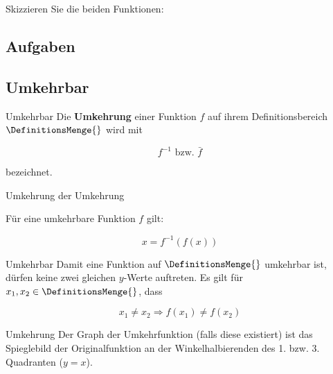 Skizzieren Sie die beiden Funktionen:

\newpage


\subsection{Aufgaben}



\newpage


\subsection{Umkehrbar}
\begin{definition}{Umkehrbar}{}
Die \textbf{Umkehrung} einer Funktion $f$ auf ihrem Definitionsbereich
$\DefinitionsMenge{}$ wird mit

  $$f^{-1} \text{ bzw. } \bar{f}$$

bezeichnet.
\end{definition}

\begin{gesetz}{Umkehrung der Umkehrung}{}

  Für eine umkehrbare Funktion $f$ gilt:
  
  $$x= f^{-1}(f(x))$$
\end{gesetz}


\begin{gesetz}{Umkehrbar}{}
  Damit eine Funktion auf $\DefinitionsMenge{}$ umkehrbar ist, dürfen keine zwei
  gleichen $y$-Werte auftreten. Es gilt für $x_1,x_2\in\DefinitionsMenge{}$,
  dass
  
  $$x_1\ne x_2 \Longrightarrow f(x_1) \ne f(x_2)$$
\end{gesetz}

\begin{bemerkung}{Umkehrung}{}
 Der Graph der Umkehrfunktion (falls diese existiert) ist das
 Spieglebild der Originalfunktion 
 an der Winkelhalbierenden des 1. bzw. 3. Quadranten ($y=x$).
\end{bemerkung}
\newpage


